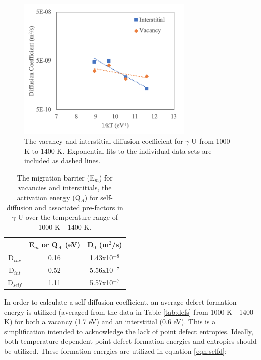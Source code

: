 \documentclass[review]{elsarticle}
\begin{document}
 \begin{figure}[h]
 \centering
 \includegraphics[width=0.75\textwidth]{diff.png} 
 \caption{The vacancy and interstitial diffusion coefficient for $\gamma$-U from 1000 K to 1400 K. Exponential fits to the individual data sets are included as dashed lines.}
 \label{fig:diff}
\end{figure}

\FloatBarrier

\begin{table}[h]
\caption{The migration barrier (E$_m$) for vacancies and interstitials, the activation energy (Q$_A$) for self-diffusion and associated pre-factors in $\gamma$-U over the temperature range of 1000 K - 1400 K.}  \label{tab:diff}
\begin{center}
\begin{tabular}{|c|c|c|}
	\hline
	 & E$_m$ or Q$_A$ (eV) & D$_0$ (m$^2$/s) \\
	 \hline
	 D$_{vac}$ & 0.16 & 1.43x10$^{-8}$ \\
	 D$_{int}$ & 0.52 & 5.56x10$^{-7}$ \\
	 D$_{self}$ & 1.11 & 5.57x10$^{-7}$ \\
	 \hline
\end{tabular}
\end{center}
\label{default}
\end{table}

In order to calculate a self-diffusion coefficient, an average defect formation energy is utilized (averaged from the data in Table \ref{tab:defs} from 1000 K - 1400 K) for both a vacancy (1.7 eV) and an interstitial (0.6 eV). This is a simplification intended to acknowledge the lack of point defect entropies. Ideally, both temperature dependent point defect formation energies and entropies should be utilized. These formation energies are utilized in equation \ref{eqn:selfd}:
\end{document}
